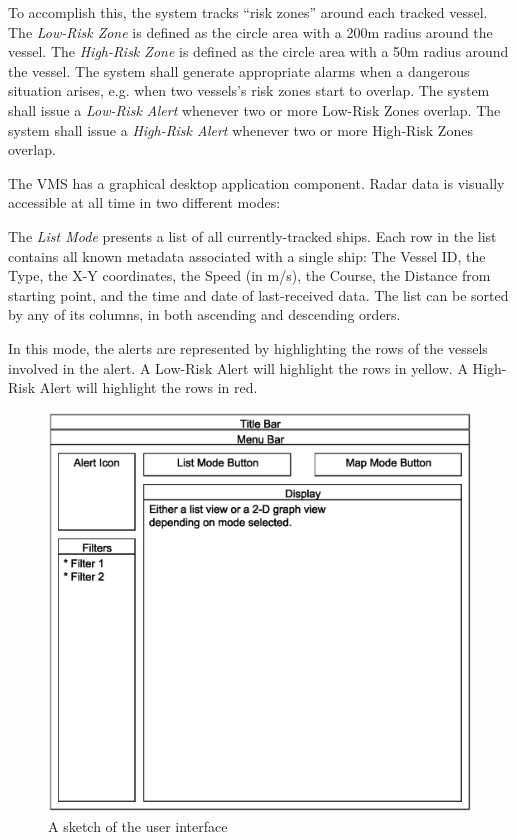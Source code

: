 \documentclass{article}
\begin{document}
To accomplish this, the system tracks ``risk zones'' around each tracked vessel. The \emph{Low-Risk Zone} is defined as the circle area with a 200m radius around the vessel. The \emph{High-Risk Zone} is defined as the circle area with a 50m radius around the vessel. The system shall generate appropriate alarms when a dangerous situation arises, e.g. when two vessels's risk zones start to overlap. The system shall issue a \emph{Low-Risk Alert} whenever two or more Low-Risk Zones overlap. The system shall issue a \emph{High-Risk Alert} whenever two or more High-Risk Zones overlap.

The VMS has a graphical desktop application component. Radar data is visually accessible at all time in two different modes:

The \emph{List Mode} presents a list of all currently-tracked ships. Each row in the list contains all known metadata associated with a single ship: The Vessel ID, the Type, the X-Y coordinates, the Speed (in m/s), the Course, the Distance from starting point, and the time and date of last-received data. The list can be sorted by any of its columns, in both ascending and descending orders.

In this mode, the alerts are represented by highlighting the rows of the vessels involved in the alert. A Low-Risk Alert will highlight the rows in yellow. A High-Risk Alert will highlight the rows in red.

\begin{figure}[h]
\caption{A sketch of the user interface}
\includegraphics[width=\linewidth]{gui-proto.eps}
\end{figure}
\end{document}
